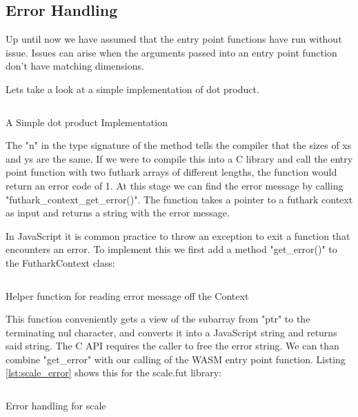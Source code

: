 \documentclass[11pt]{book}
\begin{document}
\subsection{Error Handling}

Up until now we have assumed that the entry point functions have run without issue. Issues can arise when the arguments passed into an entry point function don't have matching dimensions. 

Lets take a look at a simple implementation of dot product.
\begin{listing}[H] 
        \inputminted[fontsize=\small,baselinestretch=0.5,linenos]{JavaScript}{code/examples/futhark/dotprod.fut}
        \caption{A Simple dot product Implementation}
        \label{lst:dotprod}    
\end{listing} 

The "n" in the type signature of the method tells the compiler that the sizes of xs and ys are the same. If we were to compile this into a C library and call the entry point function with two futhark arrays of different lengths, the function would return an error code of 1. At this stage we can find the error message by calling "futhark\_context\_get\_error()". The function takes a pointer to a futhark context as input and returns a string with the error message. 

In JavaScript it is common practice to throw an exception to exit a function that encounters an  error. To implement this we first add a method "get\_error()" to the FutharkContext class:
\begin{listing}[H] 
        \inputminted[fontsize=\small,baselinestretch=0.5,linenos]{JavaScript}{code/compiler/api_examples/error.js}
        \caption{Helper function for reading error message off the Context}
        \label{lst:error}    
\end{listing} 

This function conveniently gets a view of the subarray from "ptr" to the terminating nul character, and converts it into a JavaScript string and returns said string. The C API requires the caller to free the error string. We can than combine "get\_error" with our calling of the WASM entry point function. Listing \ref{lst:scale_error} shows this for the scale.fut library:

\begin{listing}[H] 
        \inputminted[fontsize=\small,baselinestretch=0.5,linenos]{JavaScript}{code/compiler/api_examples/error_main.js}
        \caption{Error handling for scale}
        \label{lst:scale_error}    
\end{listing} 
\end{document}
